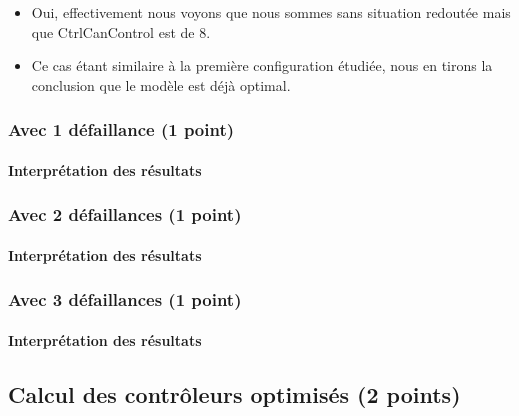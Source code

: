 \documentclass[a4paper]{book}
\begin{document}
\begin{itemize}
	\item Oui, effectivement nous voyons que nous sommes sans situation redoutée mais que CtrlCanControl est de 8.
	
	\item Ce cas étant similaire à la première configuration étudiée, nous en tirons la conclusion que le modèle est déjà optimal.
\end{itemize}

\subsubsection{Avec 1 défaillance (1 point)}





\paragraph{Interprétation des résultats}


\subsubsection{Avec 2 défaillances (1 point)}





\paragraph{Interprétation des résultats}


\subsubsection{Avec 3 défaillances (1 point)}





\paragraph{Interprétation des résultats}

\subsection{Calcul des contrôleurs optimisés (2 points)}
\end{document}
